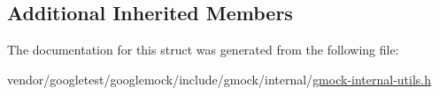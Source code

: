 \subsection*{Additional Inherited Members}


The documentation for this struct was generated from the following file\+:\begin{DoxyCompactItemize}
\item 
vendor/googletest/googlemock/include/gmock/internal/\hyperlink{gmock-internal-utils_8h}{gmock-\/internal-\/utils.\+h}\end{DoxyCompactItemize}
